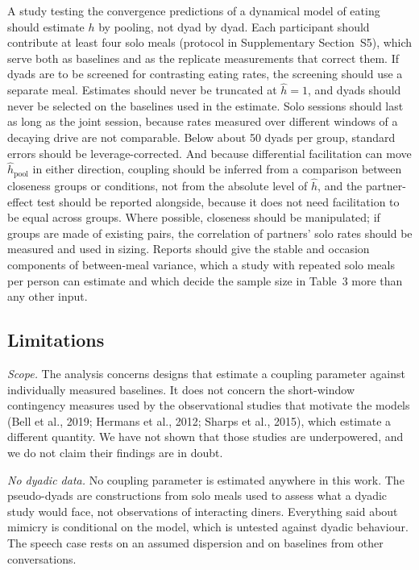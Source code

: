 \documentclass[12pt]{article}
\begin{document}
A study testing the convergence predictions of a dynamical model of eating should
estimate $h$ by pooling, not dyad by dyad. Each participant should contribute at least four solo meals (protocol in
Supplementary Section~S5), which serve both as baselines and as the replicate
measurements that correct them. If dyads are to be screened for contrasting eating
rates, the screening should use a separate meal. Estimates should never be
truncated at $\hat h=1$, and dyads should never be selected on the baselines used
in the estimate. Solo sessions should last as long as the joint session, because
rates measured over different windows of a decaying drive are not comparable.
Below about 50 dyads per group, standard errors should be leverage-corrected. And
because differential facilitation can move $\hat h_{\mathrm{pool}}$ in either
direction, coupling should be inferred from a comparison between closeness groups
or conditions, not from the absolute level of $\hat h$, and the partner-effect test
should be reported alongside, because it does not need facilitation to be equal
across groups. Where possible, closeness should be manipulated; if groups are made
of existing pairs, the correlation of partners' solo rates should be measured and
used in sizing. Reports should give the
stable and occasion components of
between-meal variance, which a study with repeated solo meals per person can
estimate and which decide the sample size in Table~3 more than any other input.

\subsection*{Limitations}

\emph{Scope.} The analysis concerns designs that estimate a coupling parameter
against individually measured baselines. It does not concern the short-window
contingency measures used by the observational studies that motivate the models
(Bell et al., 2019; Hermans et al., 2012; Sharps et al., 2015), which estimate a
different quantity. We have not shown that those studies are underpowered, and we
do not claim their findings are in doubt.

\emph{No dyadic data.} No coupling parameter is estimated anywhere in this work.
The pseudo-dyads are constructions from solo meals used to assess what a dyadic
study would face, not observations of interacting diners. Everything said about
mimicry is conditional on the model, which is untested against dyadic behaviour.
The speech case rests on an assumed dispersion and on baselines from other
conversations.
\end{document}
